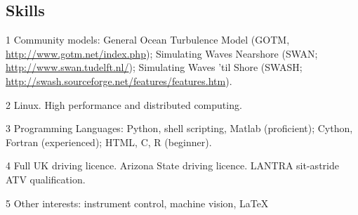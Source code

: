 \documentclass[margin,line]{resume}
\begin{document}
\begin{resume}
    \section{\mysidestyle Skills} 
    \begin{footnotesize}
    \begin{list1}
        \item[1] Community models: General Ocean Turbulence Model (GOTM, \url{http://www.gotm.net/index.php}); Simulating Waves Nearshore (SWAN; \url{http://www.swan.tudelft.nl/}); Simulating Waves 'til Shore (SWASH; \url{http://swash.sourceforge.net/features/features.htm}).\\
        \item[2] Linux. High performance and distributed computing.\\
        \item[3] Programming Languages: Python, shell scripting, Matlab (proficient); Cython, Fortran (experienced); HTML, C, R (beginner).\\
        \item[4] Full UK driving licence. Arizona State driving licence. LANTRA sit-astride ATV qualification.\\
        \item[5] Other interests: instrument control, machine vision, \LaTeX\
    \end{list1}
     \end{footnotesize}


\end{resume}
\end{document}
